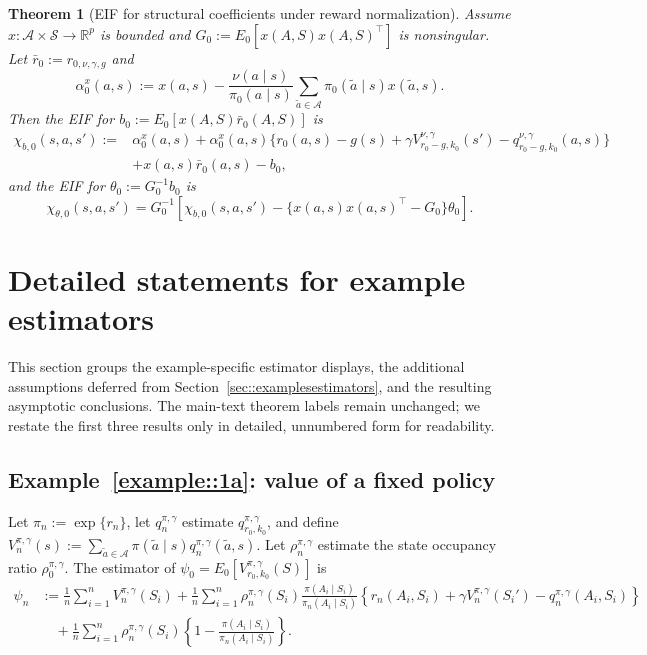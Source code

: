 \documentclass[11pt]{article}
\theoremstyle{plain}
\newtheorem{theorem}{Theorem}
\begin{document}
\begin{theorem}[EIF for structural coefficients under reward normalization]
\label{theorem::EIFcoefnorm}
Assume \(x:\mathcal A \times \mathcal S \to \mathbb R^p\) is bounded and
\(G_0 := E_0[x(A,S)x(A,S)^\top]\) is nonsingular. Let
\(\bar r_0 := r_{0,\nu,\gamma,g}\) and
\[
\alpha_0^x(a,s)
:=
x(a,s) - \frac{\nu(a\mid s)}{\pi_0(a\mid s)}
\sum_{\tilde a \in \mathcal A}\pi_0(\tilde a\mid s)x(\tilde a,s).
\]
Then the EIF for \(b_0 := E_0[x(A,S)\bar r_0(A,S)]\) is
\[
\begin{aligned}
\chi_{b,0}(s,a,s')
:={}& \alpha_0^x(a,s)
+ \alpha_0^x(a,s)\bigl\{r_0(a,s)-g(s)
+\gamma V_{r_0-g,k_0}^{\nu,\gamma}(s')
-q_{r_0-g,k_0}^{\nu,\gamma}(a,s)\bigr\} \\
&+ x(a,s)\bar r_0(a,s)-b_0,
\end{aligned}
\]
and the EIF for \(\theta_0 := G_0^{-1}b_0\) is
\[
\chi_{\theta,0}(s,a,s')
=
G_0^{-1}\!\left[
\chi_{b,0}(s,a,s')
- \{x(a,s)x(a,s)^\top - G_0\}\theta_0
\right].
\]
\end{theorem}

 


\section{Detailed statements for example estimators}
\label{app:estimator:details}
\label{app::examplesestimators}

This section groups the example-specific estimator displays, the additional
assumptions deferred from Section~\ref{sec::examplesestimators}, and the
resulting asymptotic conclusions. The main-text theorem labels remain
unchanged; we restate the first three results only in detailed, unnumbered
form for readability.

\subsection{Example~\ref{example::1a}: value of a fixed policy}

Let \(\pi_n:=\exp\{r_n\}\), let \(q_n^{\pi,\gamma}\) estimate
\(q_{r_0,k_0}^{\pi,\gamma}\), and define
\(V_n^{\pi,\gamma}(s):=\sum_{\tilde a\in\mathcal A}\pi(\tilde a\mid s)
q_n^{\pi,\gamma}(\tilde a,s)\). Let \(\rho_n^{\pi,\gamma}\) estimate the state
occupancy ratio \(\rho_0^{\pi,\gamma}\). The estimator of
\(\psi_0=E_0[V_{r_0,k_0}^{\pi,\gamma}(S)]\) is
\begin{align*}
\psi_n
&:= \frac{1}{n}\sum_{i=1}^n V_n^{\pi,\gamma}(S_i)
  + \frac{1}{n}\sum_{i=1}^n
  \rho_n^{\pi,\gamma}(S_i)
  \frac{\pi(A_i\mid S_i)}{\pi_n(A_i\mid S_i)}
  \left\{
  r_n(A_i,S_i)+\gamma V_n^{\pi,\gamma}(S_i')
  -q_n^{\pi,\gamma}(A_i,S_i)
  \right\} \\
&\quad
  + \frac{1}{n}\sum_{i=1}^n
  \rho_n^{\pi,\gamma}(S_i)
  \left\{
  1-\frac{\pi(A_i\mid S_i)}{\pi_n(A_i\mid S_i)}
  \right\}.
\end{align*}
\end{document}
